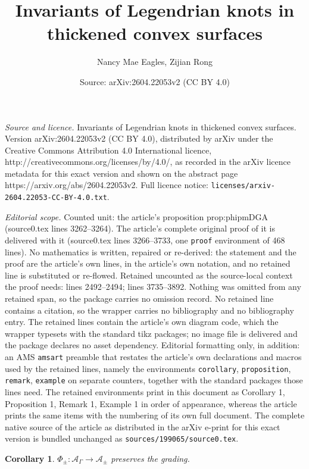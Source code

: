 \documentclass[10pt,a4paper]{amsart}
\title{Invariants of Legendrian knots in thickened convex surfaces}
\author{Nancy Mae Eagles, Zijian Rong}
\date{Source: arXiv:2604.22053v2 (CC BY 4.0)}
\newtheorem{corollary}{Corollary}
\begin{document}
\maketitle

\noindent\emph{Source and licence.} Invariants of Legendrian knots in thickened convex surfaces. Version arXiv:2604.22053v2 (CC BY 4.0), distributed by arXiv under the Creative Commons Attribution 4.0 International licence, http://creativecommons.org/licenses/by/4.0/, as recorded in the arXiv licence metadata for this exact version and shown on the abstract page https://arxiv.org/abs/2604.22053v2. Full licence notice: \texttt{licenses/arxiv-2604.22053-CC-BY-4.0.txt}.\par\smallskip

\noindent\textit{Editorial scope.} Counted unit: the article's proposition prop:phipmDGA (source0.tex lines 3262--3264). The article's complete original proof of it is delivered with it (source0.tex lines 3266--3733, one \texttt{proof} environment of 468 lines). No mathematics is written, repaired or re-derived: the statement and the proof are the article's own lines, in the article's own notation, and no retained line is substituted or re-flowed.  Retained uncounted as the source-local context the proof needs: lines 2492--2494; lines 3735--3892.  Nothing was omitted from any retained span, so the package carries no omission record.  No retained line contains a citation, so the wrapper carries no bibliography and no bibliography entry.  The retained lines contain the article's own diagram code, which the wrapper typesets with the standard tikz packages; no image file is delivered and the package declares no asset dependency.  Editorial formatting only, in addition: an AMS \texttt{amsart} preamble that restates the article's own declarations and macros used by the retained lines, namely the environments \texttt{corollary}, \texttt{proposition}, \texttt{remark}, \texttt{example} on separate counters, together with the standard packages those lines need.  The retained environments print in this document as Corollary 1, Proposition 1, Remark 1, Example 1 in order of appearance, whereas the article prints the same items with the numbering of its own full document.  The complete native source of the article as distributed in the arXiv e-print for this exact version is bundled unchanged as \texttt{sources/199065/source0.tex}.
\begin{corollary}\label{cor:phipmgrading}
    $\Phi_\pm: \mathcal{A}_\Gamma \rightarrow \mathcal{A}_\pm$ preserves the grading.
\end{corollary}
\end{document}
